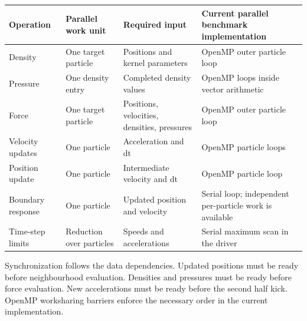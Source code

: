\documentclass[
  11pt,
]{article}
\newcounter{none} %
\begin{document}
{\def\LTcaptype{none} %
\begin{longtable}[]{@{}
  >{\raggedright\arraybackslash}p{}
  >{\raggedright\arraybackslash}p{}
  >{\raggedright\arraybackslash}p{}
  >{\raggedright\arraybackslash}p{}@{}}
\toprule\noalign{}
\begin{minipage}[b]{\linewidth}\raggedright
Operation
\end{minipage} & \begin{minipage}[b]{\linewidth}\raggedright
Parallel work unit
\end{minipage} & \begin{minipage}[b]{\linewidth}\raggedright
Required input
\end{minipage} & \begin{minipage}[b]{\linewidth}\raggedright
Current parallel benchmark implementation
\end{minipage} \\
\midrule\noalign{}
\endhead
\bottomrule\noalign{}
\endlastfoot
Density & One target particle & Positions and kernel parameters & OpenMP
outer particle loop \\
Pressure & One density entry & Completed density values & OpenMP loops
inside vector arithmetic \\
Force & One target particle & Positions, velocities, densities,
pressures & OpenMP outer particle loop \\
Velocity updates & One particle & Acceleration and dt & OpenMP particle
loops \\
Position update & One particle & Intermediate velocity and dt & OpenMP
particle loop \\
Boundary response & One particle & Updated position and velocity &
Serial loop; independent per-particle work is available \\
Time-step limits & Reduction over particles & Speeds and accelerations &
Serial maximum scan in the driver \\
\end{longtable}
}

Synchronization follows the data dependencies. Updated positions must be
ready before neighbourhood evaluation. Densities and pressures must be
ready before force evaluation. New accelerations must be ready before
the second half kick. OpenMP worksharing barriers enforce the necessary
order in the current implementation.
\end{document}
